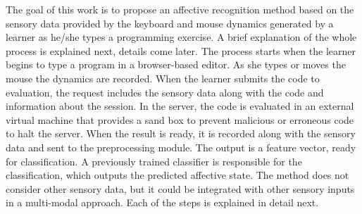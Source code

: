 \documentclass[a4paper,twoside]{article}
\begin{document}
The goal of this work is to propose an affective
recognition method based on the sensory data provided by the keyboard and mouse
dynamics generated by a learner as he/she types a programming exercise. A brief explanation of the
whole process is explained next, details come later. The process starts when the
learner begins to type a program in a browser-based editor. As she types or
moves the mouse the dynamics are recorded. When the learner submits the code to
evaluation, the request includes the sensory data along with the code and
information about the session. In the server, the code is evaluated in an
external virtual machine that provides a sand box to prevent malicious or
erroneous code to halt the server. When the result is ready, it is recorded
along with the sensory data and sent to the preprocessing module. The output is
a feature vector, ready for classification. A previously trained classifier is
responsible for the classification, which outputs the predicted affective state.
The method does not consider other sensory data, but it could be integrated with
other sensory inputs in a multi-modal approach.  Each of the steps is explained
in detail next.
\end{document}
